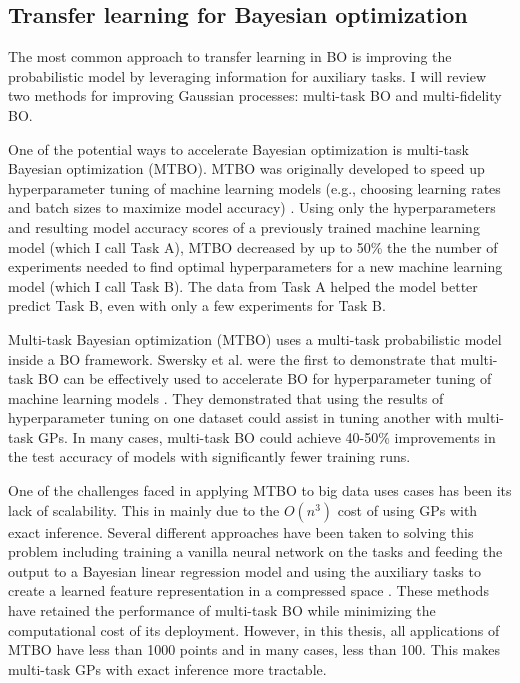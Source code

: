 \subsection{Transfer learning for Bayesian optimization}

The most common approach to transfer learning in BO is improving the probabilistic model by leveraging information for auxiliary tasks. I will review two methods for improving  Gaussian processes: multi-task BO and multi-fidelity BO.

One of the potential ways to accelerate Bayesian optimization is multi-task Bayesian optimization (MTBO). MTBO was originally developed to speed up hyperparameter tuning of machine learning models (e.g., choosing learning rates and batch sizes to maximize model accuracy) \cite{Swersky2013}. Using only the hyperparameters and resulting model accuracy scores of a previously trained machine learning model (which I call Task A),  MTBO decreased by up to 50\% the the number of experiments needed to find optimal hyperparameters for a new machine learning model (which I call Task B).  The data from Task A helped the model better predict Task B, even with only a few experiments for Task B.

Multi-task Bayesian optimization (MTBO) uses a multi-task probabilistic model inside a BO framework.  Swersky et al. were the first to demonstrate that multi-task BO can be effectively used to accelerate BO for hyperparameter tuning of machine learning models \cite{Swersky2013}. They demonstrated that using the results of hyperparameter tuning on one dataset could assist in tuning another with multi-task GPs. In many cases, multi-task BO could achieve 40-50\% improvements in the test accuracy of models with significantly fewer training runs.  

One of the challenges faced in applying MTBO to big data uses cases has been its lack of scalability. This in mainly due to the $O(n^3)$ cost of using GPs with exact inference. Several different approaches have been taken to solving this problem including training a vanilla neural network on the tasks and feeding the output to a Bayesian linear regression model \cite{Perrone2018} and using the auxiliary tasks to create a learned feature representation in a compressed space \cite{Hakhamaneshi2021}. These methods have retained the performance of multi-task BO while minimizing the computational cost of its deployment. However, in this thesis, all applications of MTBO have less than 1000 points and in many cases, less than 100. This makes multi-task GPs with exact inference more tractable.

